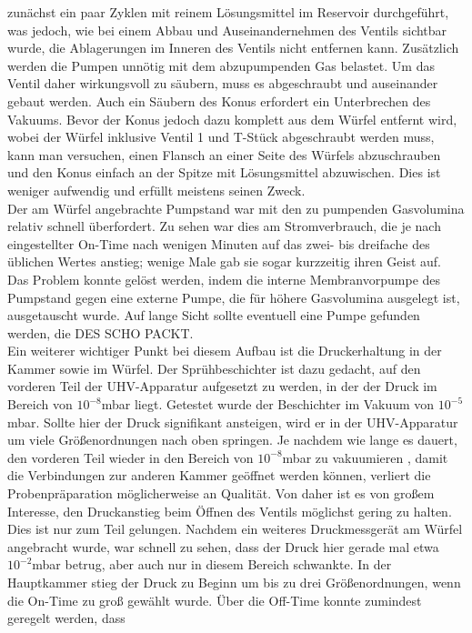 zunächst ein paar Zyklen mit reinem Lösungsmittel im Reservoir durchgeführt, was jedoch, wie bei
einem Abbau und Auseinandernehmen des Ventils sichtbar wurde, die Ablagerungen im Inneren des
Ventils nicht entfernen kann. Zusätzlich werden die Pumpen unnötig mit dem abzupumpenden Gas
belastet. Um das Ventil daher wirkungsvoll zu säubern, muss es abgeschraubt und auseinander gebaut
werden. Auch ein Säubern des Konus erfordert ein Unterbrechen des Vakuums. Bevor der Konus jedoch
dazu komplett aus dem Würfel entfernt wird, wobei der Würfel inklusive Ventil 1 und T-Stück
abgeschraubt werden muss, kann man versuchen, einen Flansch an einer Seite des Würfels abzuschrauben
und den Konus einfach an der Spitze mit Lösungsmittel abzuwischen. Dies ist weniger aufwendig und
erfüllt meistens seinen Zweck.\\
Der am Würfel angebrachte Pumpstand war mit den zu pumpenden Gasvolumina relativ schnell
überfordert. Zu sehen war dies am Stromverbrauch, die je nach eingestellter On-Time nach
wenigen Minuten auf das zwei- bis dreifache des üblichen Wertes anstieg; wenige Male gab sie sogar
kurzzeitig ihren Geist auf. Das Problem konnte gelöst werden, indem die interne Membranvorpumpe des
Pumpstand gegen eine externe Pumpe, die für höhere Gasvolumina ausgelegt ist, ausgetauscht wurde.
Auf lange Sicht sollte eventuell eine Pumpe gefunden werden, die DES SCHO PACKT.\\
Ein weiterer wichtiger Punkt bei diesem Aufbau ist die Druckerhaltung in der Kammer sowie im Würfel.
Der Sprühbeschichter ist dazu gedacht, auf den vorderen Teil der UHV-Apparatur aufgesetzt zu werden,
in der der Druck im Bereich von $10^{-8}$mbar liegt. Getestet wurde der Beschichter im Vakuum von
$10^{-5}$mbar. Sollte hier der Druck signifikant ansteigen, wird er in der UHV-Apparatur um viele
Größenordnungen nach oben springen. Je nachdem wie lange es dauert, den vorderen Teil wieder in den
Bereich von $10^{-8}$mbar zu vakuumieren , damit die Verbindungen zur anderen Kammer geöffnet werden
können, verliert die Probenpräparation möglicherweise an Qualität. Von daher ist es von großem
Interesse, den Druckanstieg beim Öffnen des Ventils möglichst gering zu halten.\\
Dies ist nur zum Teil gelungen. Nachdem ein weiteres Druckmessgerät am Würfel angebracht wurde, war
schnell zu sehen, dass der Druck hier gerade mal etwa $10^{-2}$mbar betrug, aber auch nur in diesem
Bereich schwankte. In der Hauptkammer stieg der Druck zu Beginn um bis zu drei Größenordnungen, wenn
die On-Time zu groß gewählt wurde. Über die Off-Time konnte zumindest geregelt werden, dass
